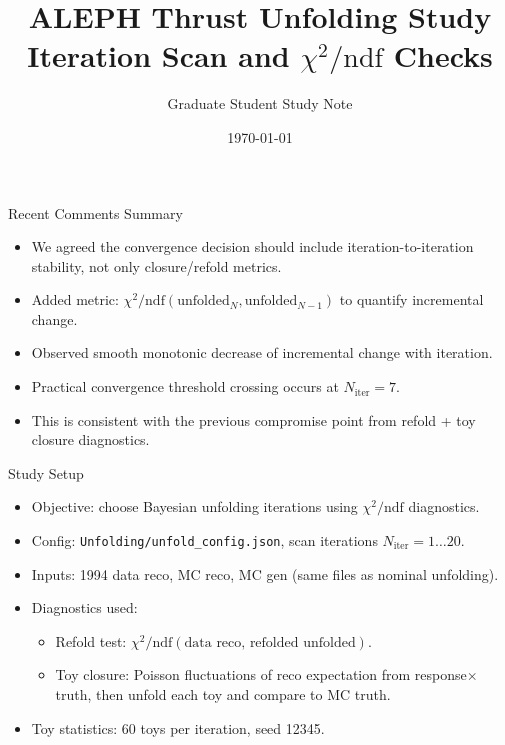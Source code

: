\documentclass[aspectratio=169]{beamer}
\title{ALEPH Thrust Unfolding Study\\Iteration Scan and $\chi^2/\mathrm{ndf}$ Checks}
\author{Graduate Student Study Note}
\date{\today}
\begin{document}
\begin{frame}
  \titlepage
\end{frame}

\begin{frame}{Recent Comments Summary}
\begin{itemize}
  \item We agreed the convergence decision should include iteration-to-iteration stability, not only closure/refold metrics.
  \item Added metric: $\chi^2/\mathrm{ndf}(\mathrm{unfolded}_{N},\mathrm{unfolded}_{N-1})$ to quantify incremental change.
  \item Observed smooth monotonic decrease of incremental change with iteration.
  \item Practical convergence threshold crossing occurs at $N_{\mathrm{iter}}=7$.
  \item This is consistent with the previous compromise point from refold + toy closure diagnostics.
\end{itemize}
\end{frame}

\begin{frame}{Study Setup}
\begin{itemize}
  \item Objective: choose Bayesian unfolding iterations using $\chi^2/\mathrm{ndf}$ diagnostics.
  \item Config: \texttt{Unfolding/unfold\_config.json}, scan iterations $N_{\mathrm{iter}}=1\dots 20$.
  \item Inputs: 1994 data reco, MC reco, MC gen (same files as nominal unfolding).
  \item Diagnostics used:
  \begin{itemize}
    \item Refold test: $\chi^2/\mathrm{ndf}(\text{data reco},\,\text{refolded unfolded})$.
    \item Toy closure: Poisson fluctuations of reco expectation from response$\times$truth, then unfold each toy and compare to MC truth.
  \end{itemize}
  \item Toy statistics: 60 toys per iteration, seed 12345.
\end{itemize}
\end{frame}
\end{document}
